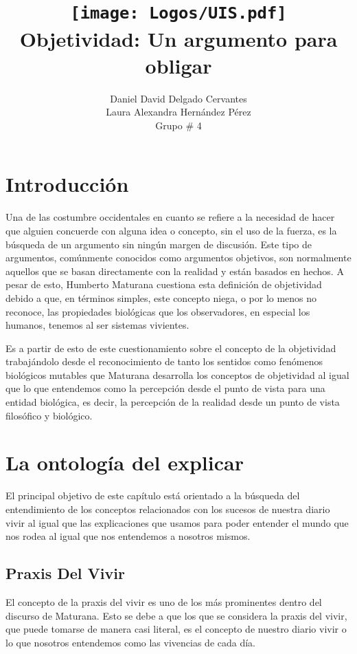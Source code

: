 \documentclass[10pt]{article}
\title{
    \texttt{[image: Logos/UIS.pdf]} \\
    Objetividad: Un argumento para obligar}
\author{Daniel David Delgado Cervantes \\  
        Laura Alexandra Hernández Pérez\\ 
        Grupo \# 4
}
\begin{document}
    
\maketitle

    \section{Introducción}

    Una de las costumbre occidentales en cuanto se refiere a la necesidad de hacer que alguien concuerde con alguna idea o concepto, sin el uso de la fuerza, es la búsqueda de un argumento sin ningún margen de discusión. Este tipo de argumentos, comúnmente conocidos como argumentos objetivos, son normalmente aquellos que se basan directamente con la realidad y están basados en hechos. A pesar de esto, Humberto Maturana cuestiona esta definición de objetividad debido a que, en términos simples, este concepto niega, o por lo menos no reconoce, las propiedades biológicas que los observadores, en especial los humanos, tenemos al ser sistemas vivientes.

    Es a partir de esto de este cuestionamiento sobre el concepto de la objetividad trabajándolo desde el reconocimiento de tanto los sentidos como fenómenos biológicos mutables que Maturana desarrolla los conceptos de objetividad al igual que lo que entendemos como la percepción desde el punto de vista para una entidad biológica, es decir, la percepción de la realidad desde un punto de vista filosófico y biológico. 

    \section{La ontología del explicar}

    El principal objetivo de este capítulo está orientado a la búsqueda del entendimiento de los conceptos relacionados con los sucesos de nuestra diario vivir al igual que las explicaciones que usamos para poder entender el mundo que nos rodea al igual que nos entendemos a nosotros mismos.

        \subsection{Praxis Del Vivir}

        El concepto de la praxis del vivir es uno de los más prominentes dentro del discurso de Maturana. Esto se debe a que los que se considera la praxis del vivir, que puede tomarse de manera casi literal, es el concepto de nuestro diario vivir o lo que nosotros entendemos como las vivencias de cada día.
        
\end{document}

